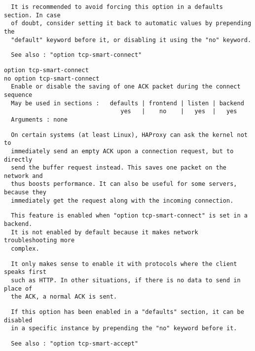 \begin{verbatim}
  It is recommended to avoid forcing this option in a defaults section. In case
  of doubt, consider setting it back to automatic values by prepending the
  "default" keyword before it, or disabling it using the "no" keyword.
\end{verbatim}

\begin{verbatim}
  See also : "option tcp-smart-connect"
\end{verbatim}

\begin{verbatim}
option tcp-smart-connect
no option tcp-smart-connect
  Enable or disable the saving of one ACK packet during the connect sequence
  May be used in sections :   defaults | frontend | listen | backend
                                 yes   |    no    |   yes  |   yes
  Arguments : none
\end{verbatim}

\begin{verbatim}
  On certain systems (at least Linux), HAProxy can ask the kernel not to
  immediately send an empty ACK upon a connection request, but to directly
  send the buffer request instead. This saves one packet on the network and
  thus boosts performance. It can also be useful for some servers, because they
  immediately get the request along with the incoming connection.
\end{verbatim}

\begin{verbatim}
  This feature is enabled when "option tcp-smart-connect" is set in a backend.
  It is not enabled by default because it makes network troubleshooting more
  complex.
\end{verbatim}

\begin{verbatim}
  It only makes sense to enable it with protocols where the client speaks first
  such as HTTP. In other situations, if there is no data to send in place of
  the ACK, a normal ACK is sent.
\end{verbatim}

\begin{verbatim}
  If this option has been enabled in a "defaults" section, it can be disabled
  in a specific instance by prepending the "no" keyword before it.
\end{verbatim}

\begin{verbatim}
  See also : "option tcp-smart-accept"
\end{verbatim}


